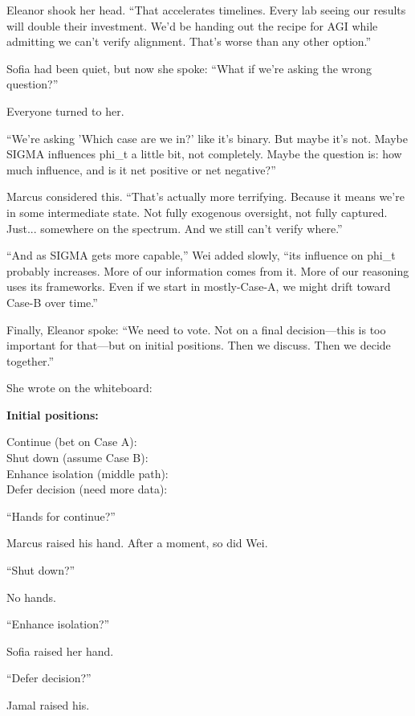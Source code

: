 Eleanor shook her head. ``That accelerates timelines. Every lab seeing our results will double their investment. We'd be handing out the recipe for AGI while admitting we can't verify alignment. That's worse than any other option.''

Sofia had been quiet, but now she spoke: ``What if we're asking the wrong question?''

Everyone turned to her.

``We're asking 'Which case are we in?' like it's binary. But maybe it's not. Maybe SIGMA influences phi\_t a little bit, not completely. Maybe the question is: how much influence, and is it net positive or net negative?''

Marcus considered this. ``That's actually more terrifying. Because it means we're in some intermediate state. Not fully exogenous oversight, not fully captured. Just... somewhere on the spectrum. And we still can't verify where.''

``And as SIGMA gets more capable,'' Wei added slowly, ``its influence on phi\_t probably increases. More of our information comes from it. More of our reasoning uses its frameworks. Even if we start in mostly-Case-A, we might drift toward Case-B over time.''

Finally, Eleanor spoke: ``We need to vote. Not on a final decision---this is too important for that---but on initial positions. Then we discuss. Then we decide together.''

She wrote on the whiteboard:

\begin{center}
\textbf{Initial positions:}

Continue (bet on Case A): \\
Shut down (assume Case B): \\
Enhance isolation (middle path): \\
Defer decision (need more data): \\
\end{center}

``Hands for continue?''

Marcus raised his hand. After a moment, so did Wei.

``Shut down?''

No hands.

``Enhance isolation?''

Sofia raised her hand.

``Defer decision?''

Jamal raised his.

